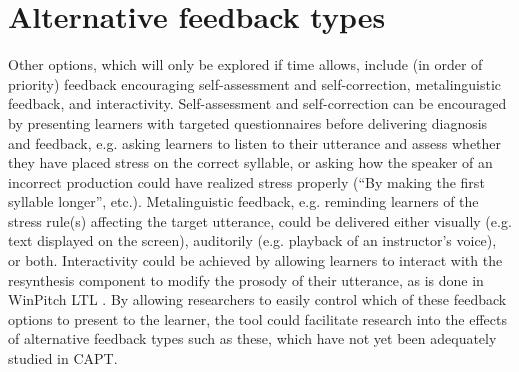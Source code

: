  



%	
	
	
	
\section{Alternative feedback types}
\label{sec:fb:alternative}

Other options, which will only be explored if time allows, include (in order of priority) feedback encouraging self-assessment and self-correction, metalinguistic feedback, and interactivity. %
 	Self-assessment and self-correction can be encouraged by presenting learners with targeted questionnaires before delivering diagnosis and feedback, e.g. asking learners to listen to their utterance and assess whether they have placed stress on the correct syllable, or 
 	asking how the speaker of an incorrect production could have realized stress properly (``By making the first syllable longer'', etc.). 
	Metalinguistic feedback, e.g. reminding learners %
of the stress rule(s) affecting the target utterance, could be delivered either visually (e.g. text displayed on the screen), auditorily (e.g. playback of an instructor's voice), or both. 
 	Interactivity could be achieved by allowing learners to interact with the resynthesis component to modify the prosody of their utterance, as is done in WinPitch LTL \citep{Martin2004}. %
 	By allowing researchers to easily control which of these feedback options to present to the learner, the tool could facilitate research into the effects of alternative feedback types such as these, which have not yet been adequately studied in CAPT.
 	
